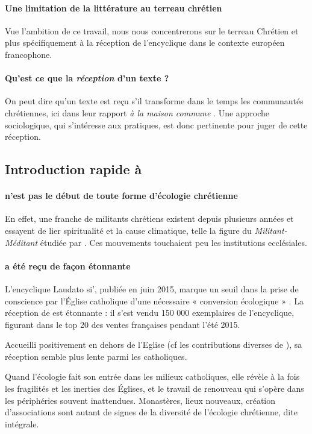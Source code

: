 \paragraph{Une limitation de la littérature au terreau chrétien} Vue l'ambition de ce travail, nous nous concentrerons sur le terreau Chrétien et plus spécifiquement à  la réception de l'encyclique \LS dans le contexte européen francophone. 

\paragraph{Qu'est ce que la \textit{réception} d'un texte ?} On peut dire qu'un texte est reçu  s'il transforme dans le temps les communautés chrétiennes, ici dans leur rapport \textit{à la maison commune }\cite{revol_reception_2017}. Une approche {sociologique}, qui s'intéresse aux pratiques, est donc pertinente pour juger de cette réception. 

\subsection{Introduction rapide à \LS}


\paragraph{\LS n'est pas le début de toute forme d'écologie chrétienne} En effet, une franche de militants chrétiens
 existent depuis plusieurs années et essayent de lier spiritualité et la cause climatique, telle la figure du \textit{Militant-Méditant} étudiée par \cite{monnot_figure_2021}. Ces mouvements touchaient peu les institutions ecclésiales.


\paragraph{\LS a été reçu de façon étonnante}
    L'encyclique Laudato si', publiée en juin 2015, marque un seuil dans la prise de conscience par l'Église catholique d'une nécessaire « conversion écologique » \cite{lang_generations_2020}.  La réception de \LS est étonnante : il s’est vendu  150 000  exemplaires de l'encyclique, figurant dans le top 20 des ventes françaises pendant l’été 2015. 
    
    
Accueilli positivement en dehors de l'Eglise (cf les contributions diverses de \cite{revol_reception_2017}), sa réception semble plus lente parmi les catholiques.
\begin{singlequote}
    Quand l'écologie fait son entrée dans les milieux catholiques, elle révèle à la fois les fragilités et les inerties des Églises, et le travail de renouveau qui s'opère dans les périphéries souvent inattendues. Monastères, lieux nouveaux, création d'associations sont autant de signes de la diversité de l'écologie chrétienne, dite intégrale.\cite[4ème de couverture]{lang_generations_2020}
\end{singlequote}

